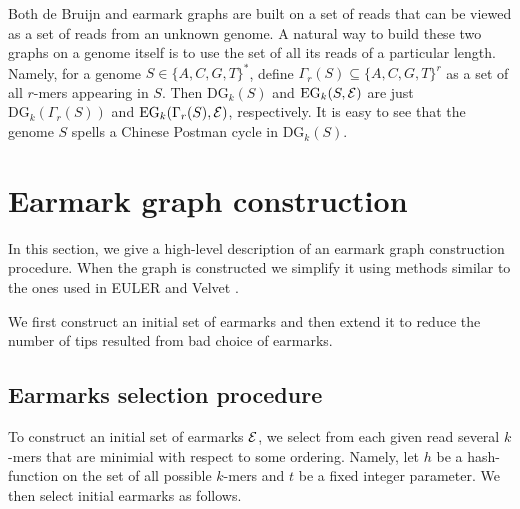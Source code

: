 \documentclass[12pt]{article}
\begin{document}
Both de Bruijn and earmark graphs are built on a set of reads that can be viewed as a 
set of reads from an unknown genome. A natural way to build these two graphs on a genome
itself is to use the set of all its reads of a particular length. Namely, 
for a genome $S \in \{A,C,G,T\}^*$, define $\Gamma_r(S) \subseteq \{A,C,G,T\}^r$
as a set of all $r$-mers appearing in $S$. Then $\textrm{DG}_k(S)$ and $\textrm{EG}_k(S, {\cal E})$
are just $\textrm{DG}_k(\Gamma_r(S))$ and $\textrm{EG}_k(\Gamma_r(S), {\cal E})$, respectively.
It is easy to see that the genome $S$ spells a Chinese Postman cycle in 
$\textrm{DG}_k(S)$.




\section{Earmark graph construction}
In this section, we give a high-level description of an earmark graph construction procedure.
When the graph is constructed we simplify it using methods similar to the ones used in
EULER \cite{PW01} and Velvet \cite{Z08}.

We first construct an initial set of earmarks and then extend it to reduce 
the number of tips
resulted from bad choice of earmarks.

\subsection{Earmarks selection procedure}
To construct an initial set of earmarks ${\cal E}$, we select from each given read 
several $k$-mers that are minimial with respect to some ordering. Namely, 
let $h$ be a hash-function on the set of all possible $k$-mers and $t$ be a 
fixed integer parameter.
We then select initial earmarks as follows.
\end{document}
